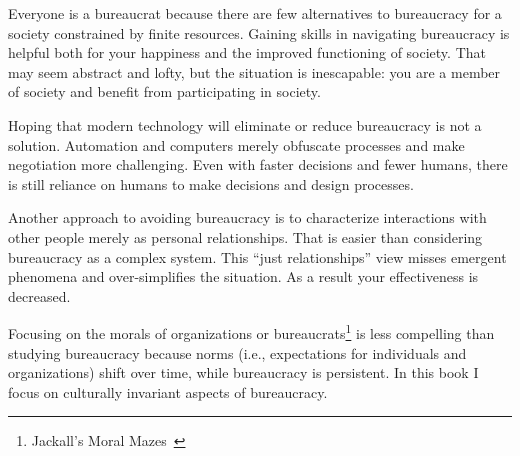 Everyone is a bureaucrat because there are few alternatives to bureaucracy for a society constrained by finite resources. Gaining skills in navigating bureaucracy is helpful both for your happiness and the improved functioning of society. That may seem abstract and lofty, but the situation is inescapable: you are a member of society and benefit from participating in society. 

Hoping that modern technology will eliminate or reduce bureaucracy is not a solution. Automation and computers merely obfuscate processes and make negotiation more challenging. Even with faster decisions and fewer humans, there is still reliance on humans to make decisions and design processes.

Another approach to avoiding bureaucracy is to characterize interactions with other people merely as personal relationships. That is easier than considering bureaucracy as a complex system.
This ``just relationships'' view misses emergent phenomena and over-simplifies the situation. As a result your effectiveness is decreased.






Focusing on the morals of organizations or bureaucrats\footnote{Jackall's Moral Mazes~\cite{2009_Jackall}} is less compelling than studying bureaucracy because norms (i.e., expectations for individuals and organizations) shift over time, while bureaucracy is persistent. 
In this book I focus on culturally invariant aspects of bureaucracy. 

